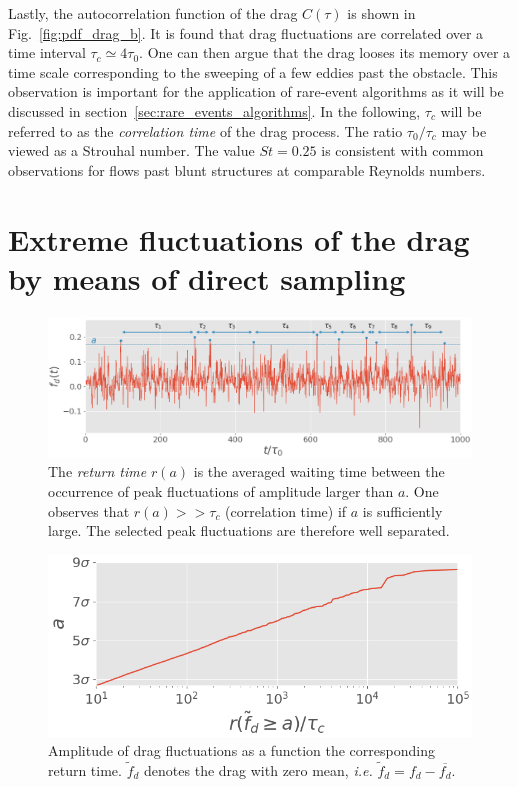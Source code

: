 \documentclass{jfm}
\begin{document}
Lastly, the autocorrelation function of the drag $C(\tau)$ is shown in Fig.~\ref{fig:pdf_drag_b}. It is found that drag fluctuations are correlated over a time interval $\tau_c \simeq 4\tau_0$. One can then argue that the drag looses its memory  over a time scale corresponding to the sweeping of a few eddies past the obstacle.
%
This observation is important for the application of rare-event algorithms as it will be discussed in section~\ref{sec:rare_events_algorithms}.
%
In the following, $\tau_c$ will be referred to as the \textit{correlation time} of the drag process.
The ratio $\tau_0 / \tau_c$ may be viewed as a {Strouhal number}. The value $St=0.25$ is consistent with common observations for flows past blunt structures at comparable Reynolds numbers.

\section{Extreme fluctuations of the drag by means of direct sampling}
\label{sec:direct_sampling}

\begin{figure}
	\centering
	\includegraphics[width=\linewidth]{illustrate_return_time/illustrate_return_time}
	\caption{\label{fig:illustrate_return_time} {The \textit{return time} $r(a)$  is the averaged waiting time between the occurrence of peak fluctuations of amplitude larger than $a$.
	One observes that $r(a) >> \tau_c$ (correlation time) if $a$ is sufficiently large. The selected peak fluctuations are therefore well separated.}
	}
\end{figure}

\begin{figure}
	\centering
	\includegraphics[width=.6\linewidth]{return_time/return_time.png}
	\caption{Amplitude of drag fluctuations as a function the corresponding return time. $\tilde{f}_d$ denotes the drag with zero mean, \textit{i.e.} $\tilde{f}_d = f_d - \overline{f_d}$.
	}
	\label{fig:return_time_instant}
\end{figure}
\end{document}
